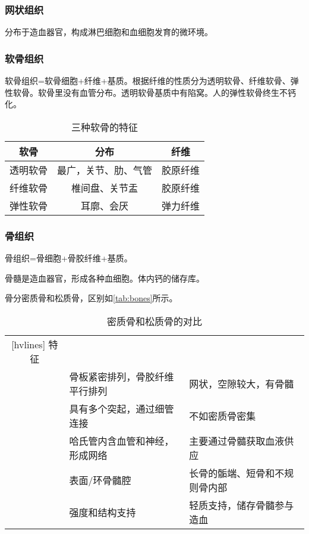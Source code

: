 \subsubsection{网状组织}

分布于造血器官，构成淋巴细胞和血细胞发育的微环境。

\subsubsection{软骨组织}

软骨组织=软骨细胞+纤维+基质。根据纤维的性质分为透明软骨、纤维软骨、弹性软骨。软骨里没有血管分布。透明软骨基质中有陷窝。人的弹性软骨终生不钙化。

\begin{table}[h!]
	\centering
	\begin{tabularx}{\textwidth}{|c|C|c|}
		\hline
		软骨 & 分布 & 纤维 \\ \hline
		透明软骨 & 最广，关节、肋、气管 & 胶原纤维 \\ \hline
		纤维软骨 & 椎间盘、关节盂 & 胶原纤维 \\ \hline
		弹性软骨 & 耳廓、会厌 & 弹力纤维 \\ \hline
	\end{tabularx}
	\caption{三种软骨的特征}
	\label{tab:3Cartilage}
\end{table}


\subsubsection{骨组织}

骨组织=骨细胞+骨胶纤维+基质。

骨髓是造血器官，形成各种血细胞。体内钙的储存库。

骨分密质骨和松质骨，区别如\autoref{tab:bones}所示。

\begin{table}[htbp]
	\centering
	\begin{NiceTabularX}{\textwidth}{cXX}[hvlines]
		特征 &  &  \\
		 & 骨板紧密排列，骨胶纤维平行排列 & 网状，空隙较大，有骨髓 \\
		 & 具有多个突起，通过细管连接 & 不如密质骨密集 \\
		 & 哈氏管内含血管和神经，形成网络 & 主要通过骨髓获取血液供应 \\
		 & 表面/环骨髓腔 & 长骨的骺端、短骨和不规则骨内部 \\
		 & 强度和结构支持 & 轻质支持，储存骨髓参与造血 \\
	\end{NiceTabularX}
	\caption{密质骨和松质骨的对比}
	\label{tab:bones}
\end{table}

